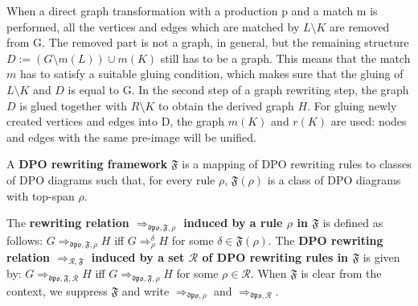 \documentclass{book}
\begin{document}
          When a direct graph transformation with a production p and a match m is performed, all the vertices and edges which are matched by $L \setminus K$ are removed from G. The removed part is not a graph, in general, but the remaining structure $D := (G \setminus m(L)) \cup  m(K)$ still has to be a graph. This means that the match $m$ has to satisfy a suitable gluing condition, which makes sure that the gluing of $L\setminus K$ and $D$ is equal to G. In the second step of a graph rewriting step, the graph $D$ is glued together with $R \setminus K$ to obtain the derived graph $H$. For gluing newly created vertices and edges into D, the graph $m(K)$ and $r(K)$ are used: nodes and edges with the same pre-image will be unified.

    \begin{definition}
        A \textbf{DPO rewriting framework} $\mathfrak{F}$ is a mapping of DPO rewriting rules to classes of DPO diagrams such that, for every rule $\rho$, $\mathfrak{F}(\rho)$ is a class of DPO diagrams with top-span $\rho$.
      \end{definition}

      
      \begin{definition}
        The \textbf{rewriting relation $\Rightarrow_{\mathfrak{dpo},\mathfrak{F},\rho}$ induced by a rule $\rho$ in $\mathfrak{F}$} is defined as follows: $G \Rightarrow_{\mathfrak{dpo},\mathfrak{F},\rho} H$ iff $G \Rightarrow_\rho^\delta H$ for some $\delta \in \mathfrak{F}(\rho)$. 
          The \textbf{DPO rewriting relation $\Rightarrow_{\mathcal{R},\mathfrak{F}}$ induced by a set $\mathcal{R}$ of DPO rewriting rules in $\mathfrak{F}$} is given by: $G \Rightarrow_{\mathfrak{dpo}, \mathfrak{F},\mathcal{R}} H$ iff $G \Rightarrow_{\mathfrak{dpo},\mathfrak{F}, \rho} H$ for some $\rho \in \mathcal{R}$. When $\mathfrak{F}$ is clear from the context, we 
          suppress $\mathfrak{F}$ and 
          write $\Rightarrow_{\mathfrak{dpo},\rho}$ and $\Rightarrow_{\mathfrak{dpo},\mathcal{R}}$.
      \end{definition} 

\end{document}
